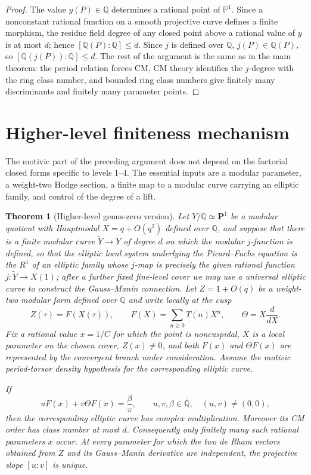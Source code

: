 \documentclass[11pt,a4paper]{amsart} %
\newtheorem{theorem}{Theorem}[section]
\theoremstyle{definition}
\newcommand{\Q}{\mathbb Q}
\newcommand{\Qbar}{\overline{\mathbb Q}}
\begin{document}
\begin{proof}
The value \(y(P)\in\Q\) determines a rational point of \(\mathbb P^1\).
Since a nonconstant rational function on a smooth projective curve defines a finite morphism, the residue field degree of any closed point above a rational value of $y$ is at most $d$; hence $[\Q(P):\Q]\le d$. Since \(j\) is defined over \(\Q\), $j(P)\in\Q(P)$, so \([\Q(j(P)):\Q]\le d\). The rest of the argument is the same as in the main theorem: the period relation forces CM, CM theory identifies the \(j\)-degree with the ring class number, and bounded ring class numbers give finitely many discriminants and finitely many parameter points.
\end{proof}

\section{Higher-level finiteness mechanism}\label{sec:higher}

The motivic part of the preceding argument does not depend on the factorial closed forms specific to levels $1$--$4$.  The essential inputs are a modular parameter, a weight-two Hodge section, a finite map to a modular curve carrying an elliptic family, and control of the degree of a lift.

\begin{theorem}[Higher-level genus-zero version]\label{thm:higher}
Let $Y/\Q\simeq\mathbf P^1$ be a modular quotient with Hauptmodul $X=q+O(q^2)$ defined over $\Q$, and suppose that there is a finite modular curve $\widetilde Y\to Y$ of degree $d$ on which the modular $j$-function is defined, so that the elliptic local system underlying the Picard–Fuchs equation is the $R^1$ of an elliptic family whose $j$-map is precisely the given rational function $j:\tilde Y\to X(1)$; after a further fixed fine-level cover we may use a universal elliptic curve to construct the Gauss--Manin connection.  Let $Z=1+O(q)$ be a weight-two modular form defined over $\Q$ and write locally at the cusp
\[
Z(\tau)=F(X(\tau)),\qquad F(X)=\sum_{n\ge0}T(n)X^n,
\qquad \Theta=X\frac{d}{dX}.
\]
Fix a rational value $x=1/C$ for which the point is noncuspidal, $X$ is a local parameter on the chosen cover, $Z(x)\ne0$, and both $F(x)$ and $\Theta F(x)$ are represented by the convergent branch under consideration.  Assume the motivic period-torsor density hypothesis for the corresponding elliptic curve.

If
\[
uF(x)+v\Theta F(x)=\frac{\beta}{\pi},
\qquad u,v,\beta\in\Qbar,\quad (u,v)\ne(0,0),
\]
then the corresponding elliptic curve has complex multiplication.  Moreover its CM order has class number at most $d$.  Consequently only finitely many such rational parameters $x$ occur.  At every parameter for which the two de Rham vectors obtained from $Z$ and its Gauss--Manin derivative are independent, the projective slope $[u:v]$ is unique.
\end{theorem}
\end{document}
